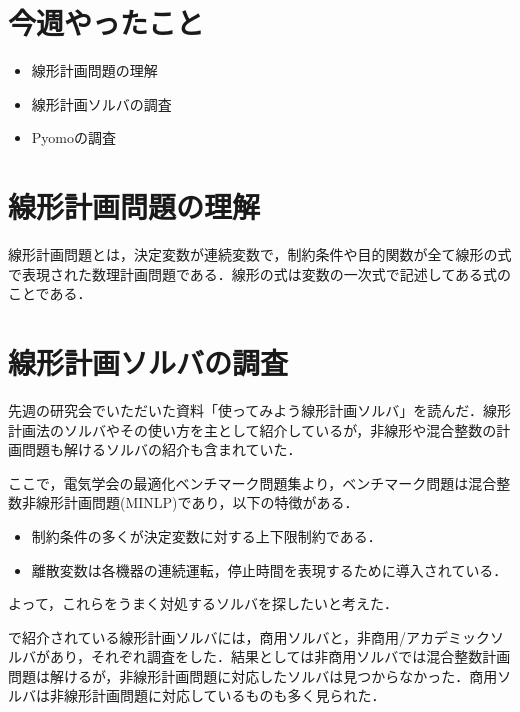 \documentclass[twocolumn]{jarticle}
\begin{document}


\section{今週やったこと}
	\begin{itemize}
		\item 線形計画問題の理解
		\item 線形計画ソルバの調査
		\item Pyomoの調査
	\end{itemize}

\section{線形計画問題の理解}
    線形計画問題とは，決定変数が連続変数で，制約条件や目的関数が全て線形の式で表現された数理計画問題である．線形の式は変数の一次式で記述してある式のことである．

\section{線形計画ソルバの調査}
    先週の研究会でいただいた資料「使ってみよう線形計画ソルバ」\cite{40021875158}を読んだ．線形計画法のソルバやその使い方を主として紹介しているが，非線形や混合整数の計画問題も解けるソルバの紹介も含まれていた．
    
    ここで，電気学会の最適化ベンチマーク問題集\cite{denki}より，ベンチマーク問題は混合整数非線形計画問題(MINLP)であり，以下の特徴がある．
    \begin{itemize}
        \item 制約条件の多くが決定変数に対する上下限制約である．
        \item 離散変数は各機器の連続運転，停止時間を表現するために導入されている．
    \end{itemize}
    よって，これらをうまく対処するソルバを探したいと考えた．

    \cite{40021875158}で紹介されている線形計画ソルバには，商用ソルバと，非商用/アカデミックソルバがあり，それぞれ調査をした．結果としては非商用ソルバでは混合整数計画問題は解けるが，非線形計画問題に対応したソルバは見つからなかった．商用ソルバは非線形計画問題に対応しているものも多く見られた．
    
\end{document}
